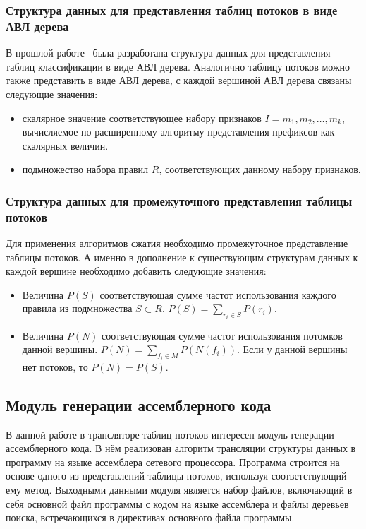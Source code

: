 \documentclass[oneside,final,12pt]{extarticle}
\begin{document}
            \subsubsection{Структура данных для представления таблиц потоков в виде АВЛ дерева}
                В прошлой работе~\cite{nik_avl} была разработана структура данных для представления таблиц классификации в виде АВЛ дерева.
                Аналогично таблицу потоков можно также представить в виде АВЛ дерева, с каждой вершиной АВЛ дерева связаны следующие значения:
                \begin{itemize}
                    \item скалярное значение соответствующее набору признаков \(I = {m_1, m_2, \ldots, m_k}\), вычисляемое по расширенному алгоритму представления префиксов 
                        как скалярных величин.
                    \item подмножество набора правил \(R\), соответствующих данному набору признаков.
                \end{itemize}
            \subsubsection{Структура данных для промежуточного представления таблицы потоков}
                Для применения алгоритмов сжатия необходимо промежуточное представление таблицы потоков.
                А именно в дополнение к существующим структурам данных к каждой вершине необходимо добавить следующие значения:
                \begin{itemize}
                    \item Величина \(P(S)\) соответствующая сумме частот использования каждого правила из подмножества \(S \subset R\). 
                        \(P(S) = \sum_{r_i \in S} P(r_i)\).
                    \item Величина \(P(N)\) соответствующая сумме частот использования потомков данной вершины. \(P(N) = \sum_{f_i \in M} P(N(f_i))\).
                        Если у данной вершины нет потоков, то \(P(N) = P(S)\).
                \end{itemize}
        \subsection{Модуль генерации ассемблерного кода}
            В данной работе в трансляторе таблиц потоков интересен модуль генерации 
            ассемблерного кода. В нём реализован алгоритм трансляции структуры данных в программу 
            на языке ассемблера сетевого процессора. Программа строится на основе одного из 
            представлений таблицы потоков, используя соответствующий ему метод. Выходными данными 
            модуля является набор файлов, включающий в себя основной файл программы с кодом 
            на языке ассемблера и файлы деревьев поиска, встречающихся в директивах основного 
            файла программы.
\end{document}
